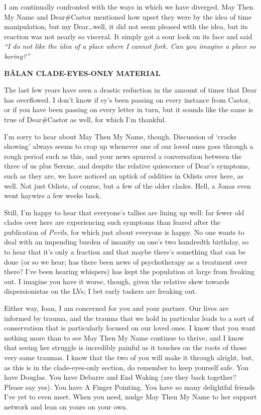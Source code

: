 I am continually confronted with the ways in which we have diverged. May Then My Name and Dear\#Castor mentioned how upset they were by the idea of time manipulation, but my Dear\ldots well, it did not seem pleased with the idea, but its reaction was not nearly so visceral. It simply got a sour look on its face and said \emph{``I do not like the idea of a place where I cannot fork. Can you imagine a place so boring?''}

\begin{center}
\textbf{BĂLAN CLADE-EYES-ONLY MATERIAL}
\end{center}

The last few years have seen a drastic reduction in the amount of times that Dear has overflowed. I don't know if ey's been passing on every instance from Castor, or if you have been passing on every letter in turn, but it sounds like the same is true of Dear\#Castor as well, for which I'm thankful.

I'm sorry to hear about May Then My Name, though. Discussion of `cracks showing' always seems to crop up whenever one of our loved ones goes through a rough period such as this, and your news spurred a conversation between the three of us plus Serene, and despite the relative quiescence of Dear's symptoms, such as they are, we have noticed an uptick of oddities in Odists over here, as well. Not just Odists, of course, but a few of the older clades. Hell, a Jonas even went haywire a few weeks back.

Still, I'm happy to hear that everyone's tallies are lining up well: far fewer old clades over here are experiencing such symptoms than feared after the publication of \emph{Perils}, for which just about everyone is happy. No one wants to deal with an impending burden of insanity on one's two hundredth birthday, so to hear that it's only a fraction and that maybe there's something that can be done (or so we hear; has there been news of psychotherapy as a treatment over there? I've been hearing whispers) has kept the population at large from freaking out. I imagine you have it worse, though, given the relative skew towards dispersionistas on the LVs; I bet early taskers are freaking out.

Either way, Ioan, I am concerned for you and your partner. Our lives are informed by trauma, and the trauma that we hold in particular leads to a sort of conservatism that is particularly focused on our loved ones. I know that you want nothing more than to see May Then My Name continue to thrive, and I know that seeing her struggle is incredibly painful as it touches on the roots of those very same traumas. I know that the two of you will make it through alright, but, as this is in the clade-eyes-only section, do remember to keep yourself safe. You have Douglas. You have Debarre and End Waking (are they back together? Please say yes). You have A Finger Pointing. You have so many delightful friends I've yet to even meet. When you need, nudge May Then My Name to her support network and lean on yours on your own.

